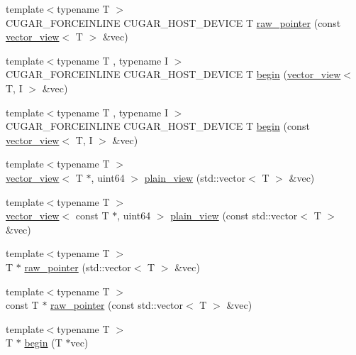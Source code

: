 \begin{DoxyCompactItemize}
\item 
{\footnotesize template$<$typename T $>$ }\\C\+U\+G\+A\+R\+\_\+\+F\+O\+R\+C\+E\+I\+N\+L\+I\+NE C\+U\+G\+A\+R\+\_\+\+H\+O\+S\+T\+\_\+\+D\+E\+V\+I\+CE T \hyperlink{group___basic_ga80c5252686ff423600f5479705b013b2}{raw\+\_\+pointer} (const \hyperlink{structcugar_1_1vector__view}{vector\+\_\+view}$<$ T $>$ \&vec)
\item 
{\footnotesize template$<$typename T , typename I $>$ }\\C\+U\+G\+A\+R\+\_\+\+F\+O\+R\+C\+E\+I\+N\+L\+I\+NE C\+U\+G\+A\+R\+\_\+\+H\+O\+S\+T\+\_\+\+D\+E\+V\+I\+CE T \hyperlink{group___basic_ga7a37aba0ec0ff22738563bca83609dca}{begin} (\hyperlink{structcugar_1_1vector__view}{vector\+\_\+view}$<$ T, I $>$ \&vec)
\item 
{\footnotesize template$<$typename T , typename I $>$ }\\C\+U\+G\+A\+R\+\_\+\+F\+O\+R\+C\+E\+I\+N\+L\+I\+NE C\+U\+G\+A\+R\+\_\+\+H\+O\+S\+T\+\_\+\+D\+E\+V\+I\+CE T \hyperlink{group___basic_gaa17977f6372733018b655cafd4a73fea}{begin} (const \hyperlink{structcugar_1_1vector__view}{vector\+\_\+view}$<$ T, I $>$ \&vec)
\item 
{\footnotesize template$<$typename T $>$ }\\\hyperlink{structcugar_1_1vector__view}{vector\+\_\+view}$<$ T $\ast$, uint64 $>$ \hyperlink{group___basic_ga6eb01f34e803fa6b384bf9930f6db426}{plain\+\_\+view} (std\+::vector$<$ T $>$ \&vec)
\item 
{\footnotesize template$<$typename T $>$ }\\\hyperlink{structcugar_1_1vector__view}{vector\+\_\+view}$<$ const T $\ast$, uint64 $>$ \hyperlink{group___basic_ga8e4563c0ae2373469c759169bd76d845}{plain\+\_\+view} (const std\+::vector$<$ T $>$ \&vec)
\item 
{\footnotesize template$<$typename T $>$ }\\T $\ast$ \hyperlink{group___basic_gaeb625b52748ed0238c5734163b1b0c67}{raw\+\_\+pointer} (std\+::vector$<$ T $>$ \&vec)
\item 
{\footnotesize template$<$typename T $>$ }\\const T $\ast$ \hyperlink{group___basic_ga97bff3b3a7f7278e5c0430158abdd4af}{raw\+\_\+pointer} (const std\+::vector$<$ T $>$ \&vec)
\item 
{\footnotesize template$<$typename T $>$ }\\T $\ast$ \hyperlink{group___basic_ga26acbb08b64652358a9b55c16f4f9f97}{begin} (T $\ast$vec)
\item 

\end{DoxyCompactItemize}

